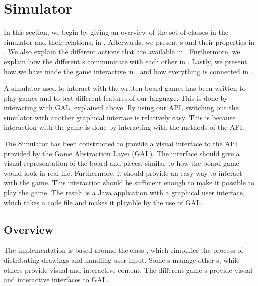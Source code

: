 \section{Simulator}
\label{sec:simulator-impl}
In this section, we begin by giving an overview of the set of classes in
the simulator and their relations, in . Afterwards, we present
s and their properties in . We also explain
the different actions that are available in . Furthermore,
we explain how the different s communicate with each other in
. Lastly, we present how we have made the game
interactive in , and how everything is connected in
.

A simulator used to interact with the written board games has been
written to play games and to test different features of our language.
This is done by interacting with GAL, explained above. By using our
API, switching out the simulator with another graphical interface is
relatively easy. This is because interaction with the \productname{}
game is done by interacting with the methods of the API.


The Simulator has been constructed to provide a visual interface to
the API provided by the Game Abstraction Layer (GAL). The interface
should give a visual representation of the board and pieces, similar
to how the board game would look in real life. Furthermore, it should
provide an easy way to interact with the game. This interaction should
be sufficient enough to make it possible to play the game. The result
is a Java application with a graphical user interface, which takes a
\productname{} code file and makes it playable by the use of GAL.

\subsection{Overview}
\label{sec:overview}

The implementation is based around the class , which
simplifies the process of distributing drawings and handling user input.
Some s manage other s, while others
provide visual and interactive content. The different game s
provide visual and interactive interfaces to GAL.

